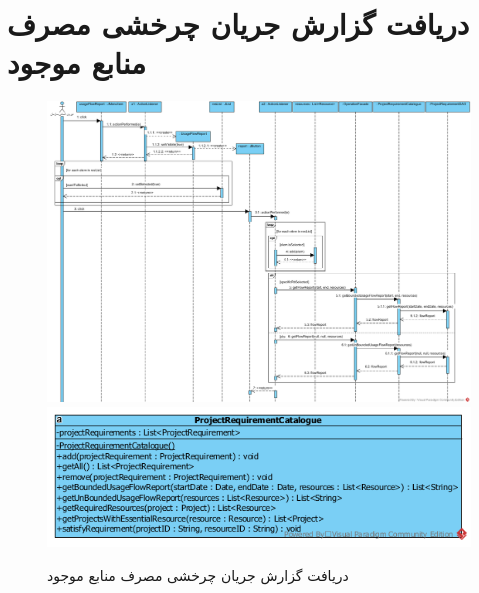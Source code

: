 \section{دریافت گزارش جریان چرخشی مصرف منابع موجود}
\begin{figure}[H]
	\centering
	\includegraphics[scale=0.7]{img/sequence-design/UsageFlowReport}
	\includegraphics[scale=0.7]{img/sequence-design/UsageFlowReportC}
	\caption{دریافت گزارش جریان چرخشی مصرف منابع موجود}
\end{figure}


